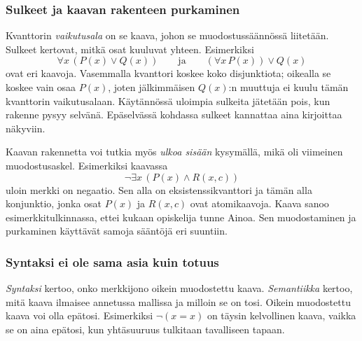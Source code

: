 \documentclass[11pt,a4paper]{amsart}
\begin{document}
\subsubsection{Sulkeet ja kaavan rakenteen purkaminen}

Kvanttorin \emph{vaikutusala} on se kaava, johon se muodostussäännössä
liitetään. Sulkeet kertovat, mitkä osat kuuluvat yhteen. Esimerkiksi
\[
  \forall x\,(P(x)\lor Q(x))
  \qquad\text{ja}\qquad
  (\forall x\,P(x))\lor Q(x)
\]
ovat eri kaavoja. Vasemmalla kvanttori koskee koko disjunktiota;
oikealla se koskee vain osaa $P(x)$, joten jälkimmäisen $Q(x)$:n
muuttuja ei kuulu tämän kvanttorin vaikutusalaan.
Käytännössä uloimpia sulkeita jätetään pois, kun rakenne pysyy selvänä.
Epäselvässä kohdassa sulkeet kannattaa aina kirjoittaa näkyviin.

Kaavan rakennetta voi tutkia myös \emph{ulkoa sisään} kysymällä,
mikä oli viimeinen muodostusaskel. Esimerkiksi kaavassa
\[
  \neg\exists x\,(P(x)\land R(x,c))
\]
uloin merkki on negaatio. Sen alla on eksistenssikvanttori ja tämän
alla konjunktio, jonka osat $P(x)$ ja $R(x,c)$ ovat atomikaavoja.
Kaava sanoo esimerkkitulkinnassa, ettei kukaan opiskelija tunne Ainoa.
Sen muodostaminen ja purkaminen käyttävät samoja sääntöjä eri suuntiin.

\clearpage
\subsubsection{Syntaksi ei ole sama asia kuin totuus}

\emph{Syntaksi} kertoo, onko merkkijono oikein muodostettu kaava.
\emph{Semantiikka} kertoo, mitä kaava ilmaisee annetussa mallissa
ja milloin se on tosi. Oikein muodostettu kaava voi olla epätosi.
Esimerkiksi $\neg(x=x)$ on täysin kelvollinen kaava, vaikka se on
aina epätosi, kun yhtäsuuruus tulkitaan tavalliseen tapaan.
\end{document}
